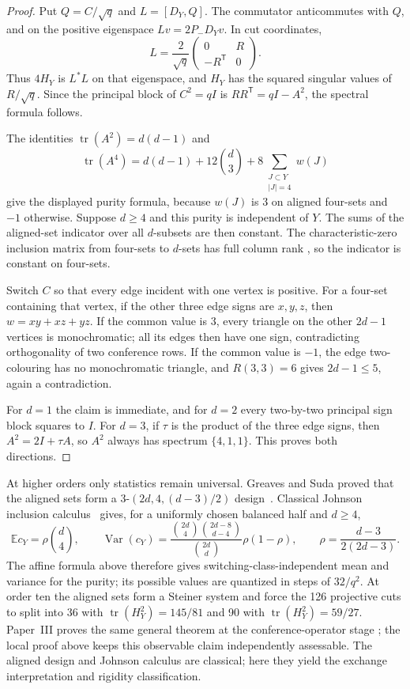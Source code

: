\documentclass[11pt]{article}
\theoremstyle{remark}
\begin{document}
\begin{proof}
Put \(Q=C/\sqrt q\) and \(L=[D_Y,Q]\).  The commutator anticommutes with
\(Q\), and on the positive eigenspace \(Lv=2P_-D_Yv\).  In cut coordinates,
\[
 L=\frac2{\sqrt q}
 \begin{pmatrix}0&R\\-R^{\mathsf T}&0\end{pmatrix}.
\]
Thus \(4H_Y\) is \(L^*L\) on that eigenspace, and \(H_Y\) has the squared
singular values of \(R/\sqrt q\).  Since the principal block of \(C^2=qI\)
is \(RR^{\mathsf T}=qI-A^2\), the spectral formula follows.

The identities \(\operatorname{tr}(A^2)=d(d-1)\) and
\[
 \operatorname{tr}(A^4)=d(d-1)+12\binom d3
   +8\sum_{\substack{J\subset Y\\|J|=4}}w(J)
\]
give the displayed purity formula, because \(w(J)\) is \(3\) on aligned
four-sets and \(-1\) otherwise.  Suppose \(d\geq4\) and this purity is
independent of \(Y\).  The sums of the aligned-set indicator over all
\(d\)-subsets are then constant.  The characteristic-zero inclusion matrix
from four-sets to \(d\)-sets has full column rank
\cite[Theorem~1]{JolliffeInclusion}, so the indicator is constant on
four-sets.

Switch \(C\) so that every edge incident with one vertex is positive.  For a
four-set containing that vertex, if the other three edge signs are \(x,y,z\),
then \(w=xy+xz+yz\).  If the common value is \(3\), every triangle on the
other \(2d-1\) vertices is monochromatic; all its edges then have one sign,
contradicting orthogonality of two conference rows.  If the common value is
\(-1\), the edge two-colouring has no monochromatic triangle, and
\(R(3,3)=6\) gives \(2d-1\leq5\), again a contradiction.

For \(d=1\) the claim is immediate, and for \(d=2\) every two-by-two
principal sign block squares to \(I\).  For \(d=3\), if \(\tau\) is the
product of the three edge signs, then \(A^2=2I+\tau A\), so \(A^2\) always
has spectrum \(\{4,1,1\}\).  This proves both directions.
\end{proof}

At higher orders only statistics remain universal.  Greaves and Suda proved
that the aligned sets form a
\(3\)-\((2d,4,(d-3)/2)\) design~\cite[Example~2.3]{GreavesSuda}.
Classical Johnson inclusion calculus~\cite{IntersectionMatrices} gives, for a
uniformly chosen balanced half and \(d\geq4\),
\[
 \mathbb E c_Y=\rho\binom d4,\qquad
 \operatorname{Var}(c_Y)=
 \frac{\binom{2d}{4}\binom{2d-8}{d-4}}{\binom{2d}{d}}
 \rho(1-\rho),
 \qquad \rho=\frac{d-3}{2(2d-3)}.
\]
The affine formula above therefore gives switching-class-independent mean and
variance for the purity; its possible values are
quantized in steps of \(32/q^2\).  At order ten the aligned sets form a
Steiner system and force the 126 projective cuts to split into 36 with
\(\operatorname{tr}(H_Y^2)=145/81\) and 90 with
\(\operatorname{tr}(H_Y^2)=59/27\).
Paper~III proves the same general theorem at the conference-operator stage
\cite[Theorem~5.1]{ClebschIII}; the local proof above keeps this
observable claim independently assessable.  The aligned design and Johnson
calculus are classical; here they yield the exchange interpretation and
rigidity classification.
\end{document}
